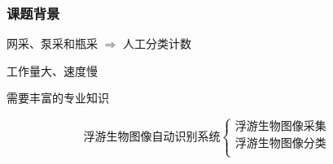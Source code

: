 \documentclass[notheorems,mathserif,table,compress]{beamer}  %
\begin{document}
\begin{frame}
\frametitle{课题背景}
\begin{tcolorbox}[colback=red!5,colframe=blue!75!black]

  \centering 网采、泵采和瓶采 \quad $\Longrightarrow$ \quad 人工分类计数

  {\color{purple}工作量大、速度慢}

  {\color{purple}需要丰富的专业知识}
\end{tcolorbox}
\pause
\begin{tcolorbox}[colback=red!5,colframe=blue!75!black]
  \begin{displaymath}
  \textrm{浮游生物图像自动识别系统}
  \left\{\begin{array}{ll}
  \textrm{浮游生物图像采集}&\\
  \textrm{浮游生物图像分类}&\\
  \end{array} \right.
  \end{displaymath}
\end{tcolorbox}
\end{frame}

\end{document}
